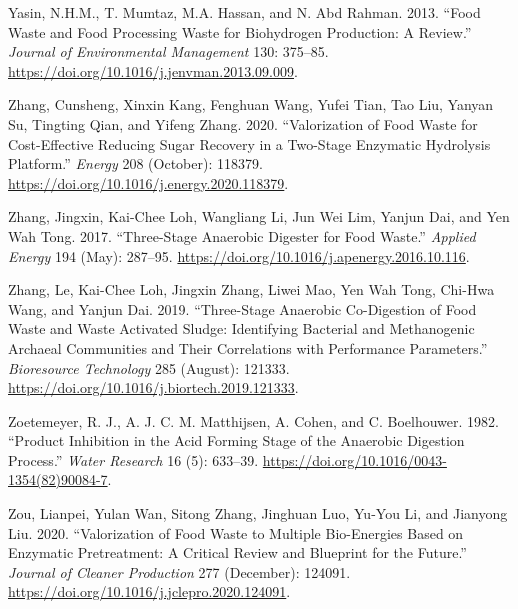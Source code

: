 \documentclass[11pt]{report}
\begin{document}
\begin{hangparas}{1.5em}{1}
\hypertarget{citeproc_bib_item_33}{Yasin, N.H.M., T. Mumtaz, M.A. Hassan, and N. Abd Rahman. 2013. “Food Waste and Food Processing Waste for Biohydrogen Production: A Review.” \textit{Journal of Environmental Management} 130: 375–85. \url{https://doi.org/10.1016/j.jenvman.2013.09.009}.}

\hypertarget{citeproc_bib_item_34}{Zhang, Cunsheng, Xinxin Kang, Fenghuan Wang, Yufei Tian, Tao Liu, Yanyan Su, Tingting Qian, and Yifeng Zhang. 2020. “Valorization of Food Waste for Cost-Effective Reducing Sugar Recovery in a Two-Stage Enzymatic Hydrolysis Platform.” \textit{Energy} 208 (October): 118379. \url{https://doi.org/10.1016/j.energy.2020.118379}.}

\hypertarget{citeproc_bib_item_35}{Zhang, Jingxin, Kai-Chee Loh, Wangliang Li, Jun Wei Lim, Yanjun Dai, and Yen Wah Tong. 2017. “Three-Stage Anaerobic Digester for Food Waste.” \textit{Applied Energy} 194 (May): 287–95. \url{https://doi.org/10.1016/j.apenergy.2016.10.116}.}

\hypertarget{citeproc_bib_item_36}{Zhang, Le, Kai-Chee Loh, Jingxin Zhang, Liwei Mao, Yen Wah Tong, Chi-Hwa Wang, and Yanjun Dai. 2019. “Three-Stage Anaerobic Co-Digestion of Food Waste and Waste Activated Sludge: Identifying Bacterial and Methanogenic Archaeal Communities and Their Correlations with Performance Parameters.” \textit{Bioresource Technology} 285 (August): 121333. \url{https://doi.org/10.1016/j.biortech.2019.121333}.}

\hypertarget{citeproc_bib_item_37}{Zoetemeyer, R. J., A. J. C. M. Matthijsen, A. Cohen, and C. Boelhouwer. 1982. “Product Inhibition in the Acid Forming Stage of the Anaerobic Digestion Process.” \textit{Water Research} 16 (5): 633–39. \url{https://doi.org/10.1016/0043-1354(82)90084-7}.}

\hypertarget{citeproc_bib_item_38}{Zou, Lianpei, Yulan Wan, Sitong Zhang, Jinghuan Luo, Yu-You Li, and Jianyong Liu. 2020. “Valorization of Food Waste to Multiple Bio-Energies Based on Enzymatic Pretreatment: A Critical Review and Blueprint for the Future.” \textit{Journal of Cleaner Production} 277 (December): 124091. \url{https://doi.org/10.1016/j.jclepro.2020.124091}.}\bigskip
\end{hangparas}
\end{document}
